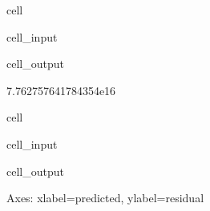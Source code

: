 \documentclass[letterpaper,10pt,english]{sphinxmanual}
\begin{document}
\begin{sphinxuseclass}{cell}
\begin{sphinxuseclass}{cell_input}
\begin{sphinxVerbatim}[commandchars=\\\{\}]
\PYG{p}{[}\PYG{p}{]}
\end{sphinxVerbatim}

\end{sphinxuseclass}
\begin{sphinxuseclass}{cell_output}
\begin{sphinxVerbatim}[commandchars=\\\{\}]
7.762757641784354e\PYGZhy{}16
\end{sphinxVerbatim}

\end{sphinxuseclass}
\end{sphinxuseclass}
\begin{sphinxuseclass}{cell}
\begin{sphinxuseclass}{cell_input}
\begin{sphinxVerbatim}[commandchars=\\\{\}]
      
\end{sphinxVerbatim}

\end{sphinxuseclass}
\begin{sphinxuseclass}{cell_output}
\begin{sphinxVerbatim}[commandchars=\\\{\}]
\PYGZlt{}Axes: xlabel=\PYGZsq{}predicted\PYGZsq{}, ylabel=\PYGZsq{}residual\PYGZsq{}\PYGZgt{}
\end{sphinxVerbatim}

\noindent{}

\end{sphinxuseclass}
\end{sphinxuseclass}
\end{document}

